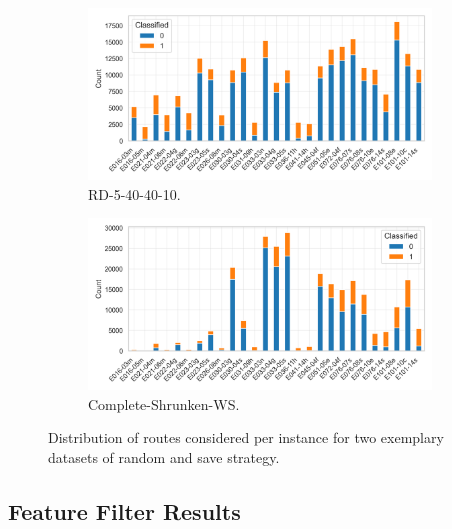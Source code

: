 \begin{figure}[ht]
	\centering
	\begin{subfigure}[t]{.5\textwidth}
		\centering
		\includegraphics[width=\linewidth]{pictures/dataset_structure/distribution_plot_RandomData_5_40_40_10.png}
		\caption{RD-5-40-40-10.}
	\end{subfigure}%
	\begin{subfigure}[t]{.5\textwidth}
		\centering
		\includegraphics[width=\linewidth]{pictures/dataset_structure/distribution_plot_gendreau_28880_600_WS_shrinked094.png}
		\caption{Complete-Shrunken-WS.}
	\end{subfigure}
	\caption[Distribution of routes considered per instance for two exemplary datasets of random and save strategy.]
	{Distribution of routes considered per instance for two exemplary datasets of random and save strategy.}
	\label{fig:comparison_noroutes_perInstancce}
\end{figure}

\subsection{Feature Filter Results}
\label{sec:feature_filter_results}

